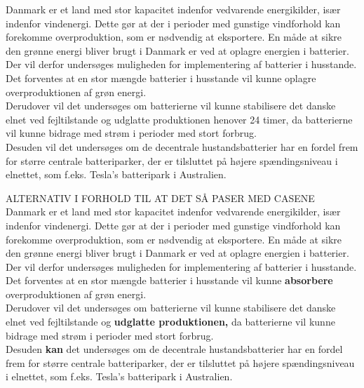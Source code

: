 
\label{Problemformulering}

Danmark er et land med stor kapacitet indenfor vedvarende energikilder, især indenfor vindenergi. Dette gør at der i perioder med gunstige vindforhold kan forekomme overproduktion, som er nødvendig at eksportere. En måde at sikre den grønne energi bliver brugt i Danmark er ved at oplagre energien i batterier. \\
Der vil derfor undersøges muligheden for implementering af batterier i husstande. Det forventes at en stor mængde batterier i husstande vil kunne oplagre overproduktionen af grøn energi. \\

Derudover vil det undersøges om batterierne vil kunne stabilisere det danske elnet ved fejltilstande og udglatte produktionen henover 24 timer, da batterierne vil kunne bidrage med strøm i perioder med stort forbrug. \\
Desuden vil det undersøges om de decentrale hustandsbatterier har en fordel frem for større centrale batteriparker, der er tilsluttet på højere spændingsniveau i elnettet, som f.eks. Tesla’s batteripark i Australien.

ALTERNATIV I FORHOLD TIL AT DET SÅ PASER MED CASENE\\
Danmark er et land med stor kapacitet indenfor vedvarende energikilder, især indenfor vindenergi. Dette gør at der i perioder med gunstige vindforhold kan forekomme overproduktion, som er nødvendig at eksportere. En måde at sikre den grønne energi bliver brugt i Danmark er ved at oplagre energien i batterier. \\
Der vil derfor undersøges muligheden for implementering af batterier i husstande. Det forventes at en stor mængde batterier i husstande vil kunne \textbf{absorbere} overproduktionen af grøn energi. \\

Derudover vil det undersøges om batterierne vil kunne stabilisere det danske elnet ved fejltilstande og \textbf{udglatte produktionen, }da batterierne vil kunne bidrage med strøm i perioder med stort forbrug. \\
Desuden \textbf{kan} det undersøges om de decentrale hustandsbatterier har en fordel frem for større centrale batteriparker, der er tilsluttet på højere spændingsniveau i elnettet, som f.eks. Tesla’s batteripark i Australien.
